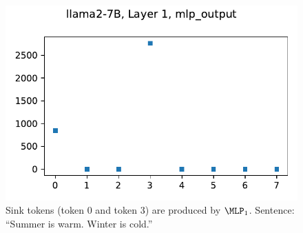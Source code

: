 \begin{figure}[H]
\begin{minipage}{.32\textwidth}
    \centering
    \includegraphics[width=.95\textwidth]{Figures/Summer/layer_1_mlp_output.pdf}
\end{minipage}
\caption{
\small
Sink tokens (token 0 and token 3) are produced by $\MLP_1$. Sentence: ``Summer is warm. Winter is cold.''
}
\label{fig:mlp1}
\vspace{-1em}
\end{figure}



